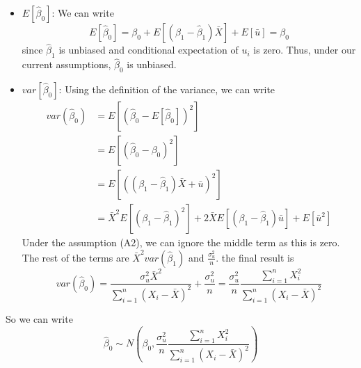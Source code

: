 \documentclass[12pt]{article}
\theoremstyle{definition}
\theoremstyle{property}
\theoremstyle{assumption}
\theoremstyle{example}
\theoremstyle{comment}
\begin{document}
\begin{itemize}
\begin{itemize}
\item $E[\hat{\beta}_0]$: We can write
\[
E[\hat{\beta}_0]=\beta_0+E[(\beta_1-\hat{\beta}_1)\bar{X}]+E[\bar{u}]=\beta_0
\]
since $\hat{\beta}_1$ is unbiased and conditional expectation of $u_i$ is zero. Thus, under our current assumptions, $\hat{\beta}_0$ is unbiased. 
\item $var[\hat{\beta}_0]$: Using the definition of the variance, we can write \[
\begin{aligned}
var(\hat{\beta}_0)&=E\left[\left(\hat{\beta}_0-E[\hat{\beta}_0]\right)^2\right] \\
&=E\left[\left(\hat{\beta}_0-{\beta}_0\right)^2\right]\\
&=E\left[\left( (\beta_1-\hat{\beta}_1)\bar{X}+\bar{u}\right)^2\right]\\
&=\bar{X}^2E\left[\left(\beta_1-\hat{\beta}_1 \right)^2\right]+ 2\bar{X}E\left[\left(\beta_1-\hat{\beta}_1 \right)\bar{u}\right] + E[\bar{u}^2]
\end{aligned}
\]
Under the assumption (A2), we can ignore the middle term as this is zero. The rest of the terms are $\bar{X}^2 var(\hat{\beta}_1)$ and $\frac{\sigma_u^2}{n}$. the final result is
\[
var(\hat{\beta}_0)=\frac{\sigma_u^2\bar{X}^2}{\sum_{i=1}^n(X_i-\bar{X})^2}+\frac{\sigma_u^2}{n}= \frac{\sigma_u^2}{n}\frac{\sum_{i=1}^nX_i^2}{\sum_{i=1}^n(X_i-\bar{X})^2}
\]
\end{itemize}
So we can write 
\[
\hat{\beta}_0 \sim N\left(\beta_0, \frac{\sigma_u^2}{n}\frac{\sum_{i=1}^nX_i^2}{\sum_{i=1}^n(X_i-\bar{X})^2}\right)
\]
\end{itemize}
\end{document}
